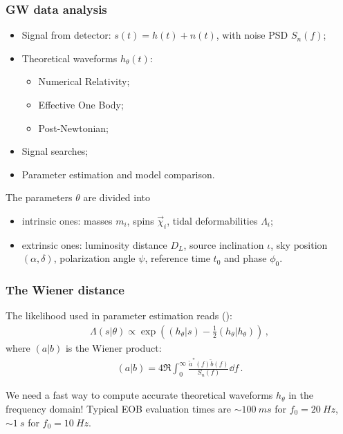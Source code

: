 \documentclass{beamer}
\begin{document}
\begin{frame}
    \frametitle{GW data analysis}
    
    \begin{itemize}
        \item Signal from detector: \(s(t) = h(t) + n(t)\), with noise PSD \(S_n (f)\);
        \item Theoretical waveforms \(h_\theta (t)\):
        \begin{itemize}
            \item Numerical Relativity;
            \item Effective One Body;
            \item Post-Newtonian;
        \end{itemize}
        \item Signal searches;
        \item Parameter estimation and model comparison.
    \end{itemize}

The parameters \(\theta \) are divided into 
\begin{itemize}
    \item intrinsic ones: masses \(m_i\), spins \(\vec{\chi}_i\), tidal deformabilities \(\Lambda_i\);
    \item extrinsic ones: luminosity distance \(D_L\), source inclination \(\iota \), sky position \((\alpha , \delta )\), polarization angle \(\psi \), reference time \(t_0 \) and phase \(\phi_0 \).
\end{itemize}
\end{frame}

\begin{frame}
    \frametitle{The Wiener distance}
    
    The likelihood used in parameter estimation reads (\cite[]{maggioreGravitationalWavesVolume2007}): 
    \begin{align}
    \Lambda (s | \theta ) \propto \exp( (h_\theta | s) - \frac{1}{2} (h_\theta | h_\theta ))
    \,,
    \end{align}
    where \((a | b)\) is the Wiener product: 
    \begin{align}
    (a | b) = 4 \Re \int_{0}^{\infty } \frac{\widetilde{a}^{*}(f) \widetilde{b} (f)}{S_n (f)} \dd{f}
    \,.
    \end{align}
    
    We need a fast way to compute accurate theoretical waveforms \(h_\theta \) in the frequency domain! Typical EOB evaluation times are \(\sim \SI{100}{ms}\) for \(f_0 = \SI{20}{Hz}\), \(\sim \SI{1}{s}\) for \(f_0 = \SI{10}{Hz}\). 
\end{frame}
\end{document}

